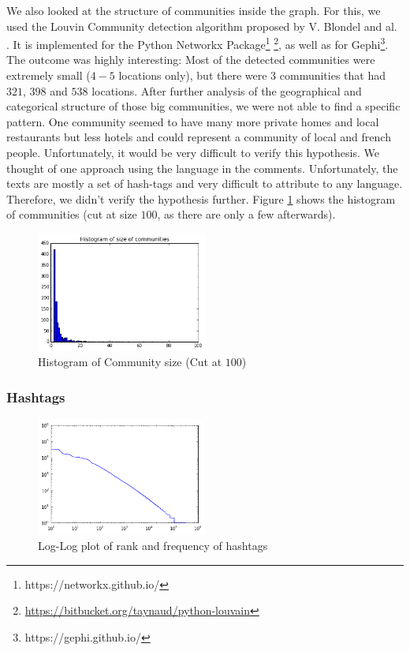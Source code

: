 We also looked at the structure of communities inside the graph. For this, we used the Louvin Community detection algorithm proposed by V. Blondel and al. \cite{blondel2008fast}. It is implemented for the Python Networkx Package\footnote{{https://networkx.github.io/}} \footnote{\url{https://bitbucket.org/taynaud/python-louvain}}, as well as for Gephi\footnote{https://gephi.github.io/}. The outcome was highly interesting: Most of the detected communities were extremely small ($4-5$ locations only), but there were 3 communities that had $321$, $398$ and $538$ locations. After further analysis of the geographical and categorical structure of those big communities, we were not able to find a specific pattern. One community seemed to have many more private homes and local restaurants but less hotels and could represent a community of local and french people. Unfortunately, it would be very difficult to verify this hypothesis. We thought of one approach using the language in the comments. Unfortunately, the texts are mostly a set of hash-tags and very difficult to attribute to any language. Therefore, we didn't verify the hypothesis further. Figure \ref{fig:community-hist} shows the histogram of communities (cut at size $100$, as there are only a few afterwards).

\begin{figure}[h!]
  \centering
    \includegraphics[width=0.5\textwidth]{images/community_size}
  \caption{Histogram of Community size (Cut at $100$)}
  \label{fig:community-hist}
\end{figure}

\subsubsection{Hashtags}

\begin{figure}[h!]
  \centering
    \includegraphics[width=0.5\textwidth]{images/hashtag-log-log}
  \caption{Log-Log plot of rank and frequency of hashtags}
  \label{fig:hashtag_log_log}
\end{figure}

